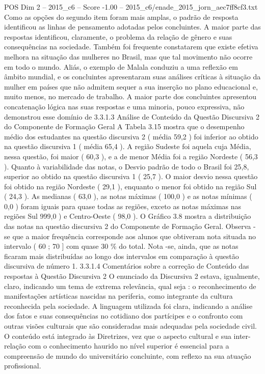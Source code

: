 \begin{textsample}{POS Dim 2 – 2015\_c6 – Score -1.00 – 2015\_c6/enade\_2015\_jorn\_aec7ff8cf3.txt}
Como as opções do segundo item foram mais amplas, o padrão de resposta identificou as linhas de pensamento adotadas pelos concluintes.
A maior parte das respostas identificou, claramente, o problema da relação de gênero e suas consequências na sociedade.
Também foi frequente constatarem que existe efetiva melhora na situação das mulheres no Brasil, mas que tal movimento não ocorre em todo o mundo.
Aliás, o exemplo de Malala conduziu a uma reflexão em âmbito mundial, e os concluintes apresentaram suas análises críticas à situação da mulher em países que não admitem sequer a sua inserção no plano educacional e, muito menos, no mercado de trabalho.
A maior parte dos concluintes apresentou concatenação lógica nas suas respostas e uma minoria, pouco expressiva, não demonstrou esse domínio de 3.3.1.3 Análise de Conteúdo da Questão Discursiva 2 do Componente de Formação Geral A Tabela 3.15 mostra que o desempenho médio dos estudantes na questão discursiva 2 ( média 59,2 ) foi inferior ao obtido na questão discursiva 1 ( média 65,4 ).
A região Sudeste foi aquela cuja Média, nessa questão, foi maior ( 60,3 ), e a de menor Média foi a região Nordeste ( 56,3 ).
Quanto à variabilidade das notas, o Desvio padrão de todo o Brasil foi 25,8, superior ao obtido na questão discursiva 1 ( 25,7 ).
O maior desvio nessa questão foi obtido na região Nordeste ( 29,1 ), enquanto o menor foi obtido na região Sul ( 24,3 ).
As medianas ( 63,0 ), as notas máximas ( 100,0 ) e as notas mínimas ( 0,0 ) foram iguais para quase todas as regiões, exceto as notas máximas nas regiões Sul 999,0 ) e Centro-Oeste ( 98,0 ).
O Gráfico 3.8 mostra a distribuição das notas na questão discursiva 2 do Componente de Formação Geral.
Observa -se que a maior frequência corresponde aos alunos que obtiveram nota situada no intervalo ( 60 ; 70 ] com quase 30 \% do total.
Nota -se, ainda, que as notas ficaram mais distribuídas ao longo dos intervalos em comparação à questão discursiva de número 1. 3.3.1.4 Comentários sobre a correção de Conteúdo das respostas à Questão Discursiva 2 O enunciado da Discursiva 2 estava, igualmente, claro, indicando um tema de extrema relevância, qual seja : o reconhecimento de manifestações artísticas nascidas na periferia, como integrante da cultura reconhecida pela sociedade.
A linguagem utilizada foi clara, indicando a análise dos fatos e suas consequências no cotidiano dos partícipes e o confronto com outras visões culturais que são consideradas mais adequadas pela sociedade civil.
O conteúdo está integrado às Diretrizes, vez que o aspecto cultural e sua inter-relação com o conhecimento haurido no nível superior é essencial para a compreensão de mundo do universitário concluinte, com reflexo na sua atuação profissional.

\end{textsample}
